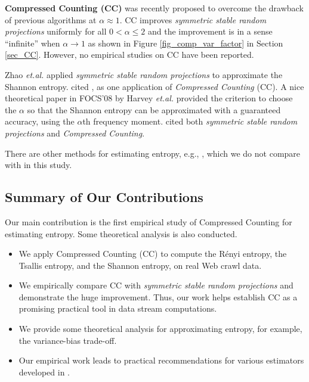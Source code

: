 \documentclass{sig-alternate}
\begin{document}
\textbf{Compressed Counting (CC)}\cite{Article:Li_CC_v0,Article:Li_CC,Report:Li_CC_oq} was recently proposed to overcome the drawback of previous algorithms at $\alpha\approx 1$. CC improves {\em symmetric stable random projections} uniformly for all $0<\alpha\leq 2$ and the improvement is in a sense ``infinite'' when $\alpha\rightarrow 1$ as shown in Figure \ref{fig_comp_var_factor} in Section \ref{sec_CC}. However, no empirical studies on CC have been reported.

Zhao {\em et.al.}\cite{Proc:Zhao_IMC07} applied {\em symmetric stable random projections} to approximate the Shannon entropy. \cite{Article:Li_CC} cited \cite{Proc:Zhao_IMC07}, as one application of {\em Compressed Counting} (CC).  A nice  theoretical paper in FOCS'08 by Harvey {\em et.al.}\cite{Article:Harvey_entropy_arXiv08,Proc:Harvey_FOCS08} provided the criterion to choose the $\alpha$ so that the Shannon entropy can be approximated with a guaranteed accuracy, using the $\alpha$th frequency moment. \cite{Proc:Harvey_FOCS08} cited both {\em symmetric stable random projections}\cite{Article:Indyk_JACM06,Proc:Li_SODA08} and {\em Compressed Counting}\cite{Article:Li_CC}.


There are other methods for estimating entropy, e.g., \cite{Proc:Guha_SODA06}, which we do not compare with in this study.

\subsection{Summary of Our Contributions}

Our main contribution is the first empirical study of Compressed Counting for estimating entropy.  Some theoretical analysis is also conducted.
\begin{itemize}
\item  We apply Compressed Counting (CC) to compute the R\'enyi entropy, the Tsallis entropy, and the Shannon entropy, on real Web crawl data.
\item We empirically compare CC with {\em symmetric stable random projections} and demonstrate the huge improvement. Thus, our work helps establish CC as a promising practical tool in data stream computations.
\item We provide some theoretical analysis for approximating entropy, for example, the variance-bias trade-off.
\item Our empirical work leads to practical recommendations for various estimators developed in \cite{Article:Li_CC_v0,Article:Li_CC,Report:Li_CC_oq}.
\end{itemize}
\end{document}
